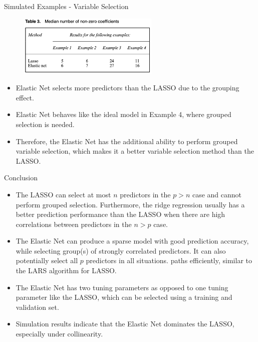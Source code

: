     \begin{frame}{Simulated Examples - Variable Selection}
        \begin{figure}
            \centering
            \includegraphics[width=0.6\textwidth]{img/Table 3.png}
            \label{fig:enter-label}
        \end{figure}
        \begin{itemize}
            \item Elastic Net selects more predictors than the LASSO due to the grouping effect. 
            \item Elastic Net behaves like the ideal model in Example 4, where grouped selection is needed.
            \item Therefore, the Elastic Net has the additional ability to perform grouped variable selection, which makes it a better variable selection method than the LASSO.

        \end{itemize}
    \end{frame}
    \begin{frame}{Conclusion}
    \begin{itemize}
        \item The LASSO can select at most $n$ predictors in the $p>n$ case and cannot perform grouped selection. Furthermore, the ridge regression usually has a better prediction performance than the LASSO when there are high correlations between predictors in the $n>p$ case.
        \item The Elastic Net can produce a sparse model with good prediction accuracy, while
 selecting group(s) of strongly correlated predictors. It can also potentially select all $p$
 predictors in all situations.
 paths efficiently, similar to the LARS algorithm for LASSO.
        \item The Elastic Net has two tuning parameters as opposed to one tuning parameter like the LASSO, which can be selected using a training and validation set.
        \item Simulation results indicate that the Elastic Net dominates the LASSO, especially
 under collinearity.
    \end{itemize}
        
    \end{frame}

